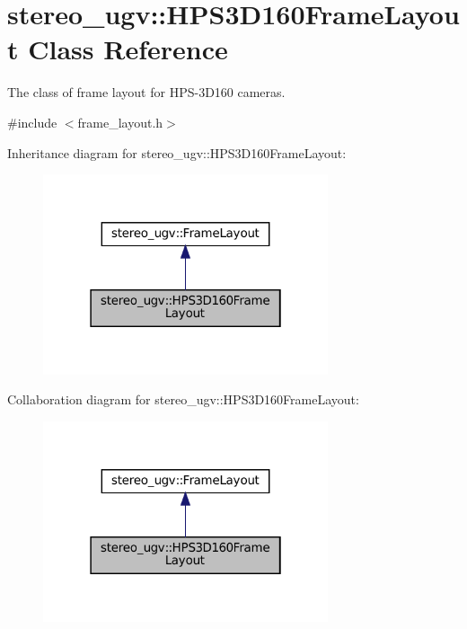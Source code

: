 \hypertarget{classstereo__ugv_1_1HPS3D160FrameLayout}{}\section{stereo\+\_\+ugv\+:\+:H\+P\+S3\+D160\+Frame\+Layout Class Reference}
\label{classstereo__ugv_1_1HPS3D160FrameLayout}


The class of frame layout for H\+P\+S-\/3\+D160 cameras.  




{\ttfamily \#include $<$frame\+\_\+layout.\+h$>$}



Inheritance diagram for stereo\+\_\+ugv\+:\+:H\+P\+S3\+D160\+Frame\+Layout\+:\nopagebreak
\begin{figure}[H]
\begin{center}
\leavevmode
\includegraphics[width=238pt]{classstereo__ugv_1_1HPS3D160FrameLayout__inherit__graph}
\end{center}
\end{figure}


Collaboration diagram for stereo\+\_\+ugv\+:\+:H\+P\+S3\+D160\+Frame\+Layout\+:\nopagebreak
\begin{figure}[H]
\begin{center}
\leavevmode
\includegraphics[width=238pt]{classstereo__ugv_1_1HPS3D160FrameLayout__coll__graph}
\end{center}
\end{figure}
